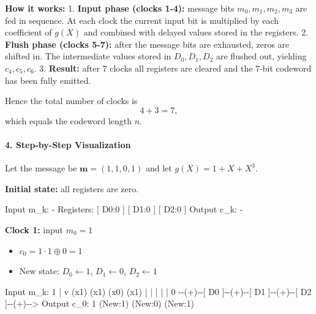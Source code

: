 \documentclass[
]{article}
\newenvironment{Shaded}{}{}
\newcommand{\NormalTok}[1]{#1}
\providecommand{\tightlist}{%
  \setlength{\itemsep}{0pt}\setlength{\parskip}{0pt}}
\begin{document}
\textbf{How it works:} 1. \textbf{Input phase (clocks 1-4):} message
bits \(m_0,m_1,m_2,m_3\) are fed in sequence. At each clock the current
input bit is multiplied by each coefficient of \(g(X)\) and combined
with delayed values stored in the registers. 2. \textbf{Flush phase
(clocks 5-7):} after the message bits are exhausted, zeros are shifted
in. The intermediate values stored in \(D_0,D_1,D_2\) are flushed out,
yielding \(c_4,c_5,c_6\). 3. \textbf{Result:} after 7 clocks all
registers are cleared and the 7-bit codeword has been fully emitted.

Hence the total number of clocks is \[4 + 3 = 7,\] which equals the
codeword length \(n\).

\paragraph{4. Step-by-Step
Visualization}\label{step-by-step-visualization}

Let the message be \(\mathbf{m}=(1,1,0,1)\) and let \(g(X)=1+X+X^3\).

\textbf{Initial state:} all registers are zero.

\begin{Shaded}
\begin{Highlighting}[]
\NormalTok{Input m\_k: {-}}
\NormalTok{Registers: [ D0:0 ] [ D1:0 ] [ D2:0 ]}
\NormalTok{Output c\_k: {-}}
\end{Highlighting}
\end{Shaded}

\textbf{Clock 1:} input \(m_0=1\)

\begin{itemize}
\tightlist
\item
  \(c_0 = 1 \cdot 1 \oplus 0 = 1\)
\item
  New state: \(D_0 \leftarrow 1\), \(D_1 \leftarrow 0\),
  \(D_2 \leftarrow 1\)
\end{itemize}

\begin{Shaded}
\begin{Highlighting}[]
\NormalTok{Input m\_k: 1}
\NormalTok{     |}
\NormalTok{     v (x1)   (x1)   (x0)   (x1)}
\NormalTok{     |   |      |      |      |}
\NormalTok{0 {-}{-}(+){-}{-}[ D0 ]{-}{-}(+){-}{-}[ D1 ]{-}{-}(+){-}{-}[ D2 ]{-}{-}(+){-}{-}\textgreater{} Output c\_0: 1}
\NormalTok{         (New:1)      (New:0)      (New:1)}
\end{Highlighting}
\end{Shaded}
\end{document}
